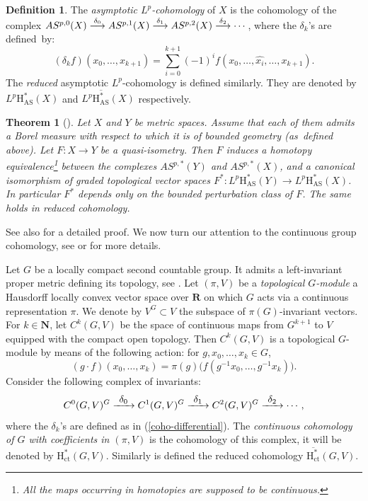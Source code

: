 \documentclass[JEP,XML,SOM,Unicode,published]{cedram}
\newcommand\To[1]{\mathchoice{\xrightarrow{\textstyle\kern4pt#1\kern3pt}}{\stackrel{#1}{\longrightarrow}}{}{}}
\newcommand{\AS}{\mathrm{AS}}
\newcommand{\ct}{\mathrm{ct}}
\newcommand{\rH}{\mathrm{H}}
\newcommand{\NN}{\mathbf{N}}
\newcommand{\RR}{\mathbf{R}}
\theoremstyle{plain}
\newtheorem{theorem}[equation]{Theorem}
\theoremstyle{remark}
\theoremstyle{definition}
\newtheorem{definition}[equation]{Definition}
\begin{document}
\begin{definition}\label{semi-direct-definition1} The \emph{asymptotic $L^p$\nobreakdash-cohomology} of $X$ is the cohomology of the complex
$AS^{p,0}(X) \To{\delta_0} AS^{p,1}(X) \To{\delta_1} AS^{p,2}(X) \To{\delta_2} \cdots$,
where the $\delta_k$'s are defined~by:
\begin{equation}\label{coho-differential}
(\delta_k f)(x_0, \dots , x_{k+1}) = \sum_{i =0}^{k+1} (-1)^{i} f(x_0 , \dots , \hat{x_i}, \dots , x_{k+1}).
\end{equation}
The \emph{reduced} asymptotic $L^p$\nobreakdash-cohomology is defined similarly.
They are denoted by $L^p \rH_\AS^* (X)$
and $L^p \overline{\rH_\AS^*} (X)$ respectively.
\end{definition}

\begin{theorem}[{\cite[\S 2]{Pa95}}]
\label{coho-theorem1}
Let $X$ and $Y$ be metric spaces.
Assume that each of them admits a Borel measure with respect to which it is of bounded geometry (as~defined above).
Let $F: X \to Y$ be a quasi-isometry.
Then $F$ induces a homotopy equivalence\footnote{All the maps occurring in homotopies are supposed to be continuous.}
between the complexes $AS^{p,*}(Y)$ and $AS^{p,*}(X)$,
and a canonical isomorphism of graded topological vector spaces $F^*: L^p \rH_\AS^* (Y) \to L^p \rH_\AS^* (X)$.
In particular $F^*$ depends only on the bounded perturbation class of $F$. The same holds in reduced cohomology.
\end{theorem}

See also \cite{Genton, SaSc} for a detailed proof.
We now turn our attention to the continuous group cohomology,
see \cite[Chap.\,IX]{BW} or \cite{Gui} for more details.

Let $G$ be a locally compact second countable group. It admits a left-invariant proper metric defining its topology, see \eg 
\cite[Struble Th.\,2.B.4]{CdH}. Let $(\pi, V)$ be a \emph{topological $G$-module} \ie a Hausdorff locally convex
vector space over $\RR$ on which $G$ acts via a continuous representation $\pi$.
We denote by $V^G \subset V$ the subspace of $\pi(G)$-invariant vectors.
For $k \in {\NN}$, let $C^k(G, V)$ be the space of continuous maps from $G^{k+1}$ to $V$ equipped with the compact open topology.
Then $C^k(G,V)$ is a topological $G$-module by means of the following action:
for $g, x_0, \dots , x_k \in G$,
\[(g \cdot f) (x_0, \dots , x_k) = \pi(g) \bigl(f(g^{-1} x_0, \dots , g^{-1} x_k)\bigr).\]
Consider the following complex of invariants:
\[C^0(G,V)^G \To{\delta_0} C^1(G,V)^G \To{\delta_1} C^2(G,V)^G \To{\delta_2} \cdots, \]
where the $\delta_k$'s are defined as in (\ref{coho-differential}).
The \emph{continuous cohomology of $G$ with coefficients in $(\pi ,V)$} is the cohomology of this complex, it will be denoted
by $\rH_\ct^*(G, V)$. Similarly is defined the reduced cohomology $\overline{\rH_\ct^*}(G, V)$.
\end{document}
